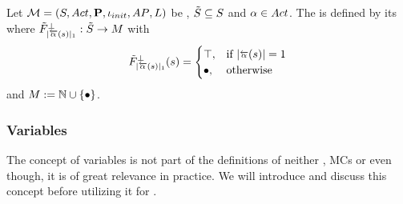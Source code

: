 \documentclass[preview]{standalone}
\begin{document}
\begin{definition}
	Let ${{{\mathcal{M}}}} = {{({S}, {Act}, {\textbf{P}}, {\iota_{init}}, {AP}, {L})}}$ be \achgphN, ${\tilde{{S}}} \subseteq {S}$ and ${\alpha} \in {Act}$. The \viewN \viewinactsingle is defined by its \grpfctN \gfctinactsingle where $\gfctsubinactsingle : \smstates \to \imggrp$ with
	\[
	\gfctsubinactsingle(\state) =
	\begin{cases}
		\hasppty, &\text{if } |\inacts(\state)| = 1 \\ 
		\remelem, &\text{otherwise}
	\end{cases}
	\]
	and $\imggrp := \natnums \cup \remset$.
\end{definition}

\subsubsection{Variables}
The concept of variables is not part of the definitions of neither \tsN, MCs or \mdpsN even though, it is of great relevance in practice. We will introduce and discuss this concept before utilizing it for \viewsN.
\end{document}
